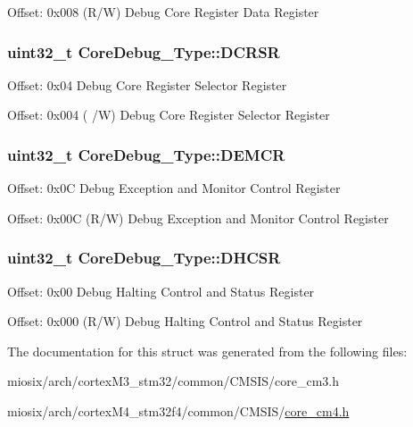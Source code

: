 Offset\-: 0x008 (R/\-W) Debug Core Register Data Register \hypertarget{struct_core_debug___type_afefa84bce7497652353a1b76d405d983}{
\subsubsection[{D\-C\-R\-S\-R}]{ uint32\-\_\-t Core\-Debug\-\_\-\-Type\-::\-D\-C\-R\-S\-R}}\label{struct_core_debug___type_afefa84bce7497652353a1b76d405d983}
Offset\-: 0x04 Debug Core Register Selector Register

Offset\-: 0x004 ( /\-W) Debug Core Register Selector Register \hypertarget{struct_core_debug___type_a5cdd51dbe3ebb7041880714430edd52d}{
\subsubsection[{D\-E\-M\-C\-R}]{ uint32\-\_\-t Core\-Debug\-\_\-\-Type\-::\-D\-E\-M\-C\-R}}\label{struct_core_debug___type_a5cdd51dbe3ebb7041880714430edd52d}
Offset\-: 0x0\-C Debug Exception and Monitor Control Register

Offset\-: 0x00\-C (R/\-W) Debug Exception and Monitor Control Register \hypertarget{struct_core_debug___type_a25c14c022c73a725a1736e903431095d}{
\subsubsection[{D\-H\-C\-S\-R}]{ uint32\-\_\-t Core\-Debug\-\_\-\-Type\-::\-D\-H\-C\-S\-R}}\label{struct_core_debug___type_a25c14c022c73a725a1736e903431095d}
Offset\-: 0x00 Debug Halting Control and Status Register

Offset\-: 0x000 (R/\-W) Debug Halting Control and Status Register 

The documentation for this struct was generated from the following files\-:\begin{DoxyCompactItemize}
\item 
miosix/arch/cortex\-M3\-\_\-stm32/common/\-C\-M\-S\-I\-S/core\-\_\-cm3.\-h\item 
miosix/arch/cortex\-M4\-\_\-stm32f4/common/\-C\-M\-S\-I\-S/\hyperlink{core__cm4_8h}{core\-\_\-cm4.\-h}\end{DoxyCompactItemize}

